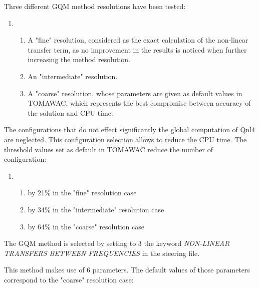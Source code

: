  Three different GQM method resolutions have been tested:

\begin{enumerate}
\item \begin{enumerate}
\item  A "fine" resolution, considered as the exact calculation of the non-linear transfer term, as no improvement in the results is noticed when further increasing the method resolution.

\item  An "intermediate" resolution.

\item  A "coarse" resolution, whose parameters are given as default values in TOMAWAC, which represents the best compromise between accuracy of the solution and CPU time.
\end{enumerate}
\end{enumerate}

 The configurations that do not effect significantly the global computation of Qnl4 are neglected. This configuration selection allows to reduce the CPU time. The threshold values set as default in TOMAWAC reduce the number of configuration:

\begin{enumerate}
\item \begin{enumerate}
\item  by 21\% in the "fine" resolution case

\item  by 34\% in the "intermediate" resolution case

\item  by 64\% in the "coarse" resolution case
\end{enumerate}
\end{enumerate}

 The GQM method is selected by setting to 3 the keyword \textit{NON-LINEAR TRANSFERS BETWEEN FREQUENCIES} in the steering file.\textbf{}

 This method makes use of 6 parameters. The default values of those parameters correspond to the "coarse" resolution case:


